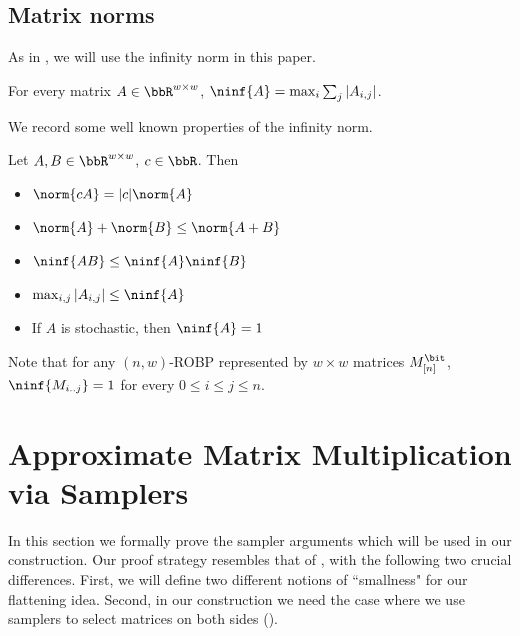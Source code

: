 \subsection{Matrix norms}
As in \cite{BCG18}, we will use the infinity norm in this paper.
\begin{definition}
For every matrix $A\in\bbR^{w\times w}$, $\ninf{A}=\max_i{\sum_j |A_{i,j}|}$.
\end{definition}
We record some well known properties of the infinity norm.
\begin{claim}
Let $A,B\in\bbR^{w\times w}$, $c\in \bbR$. Then
\begin{itemize}
\item
$\norm{cA}=|c|\norm{A}$
\item
$\norm{A}+\norm{B}\le\norm{A+B}$
\item
$\ninf{AB}\le \ninf{A}\ninf{B}$ 
\item
 $\max_{i,j} |A_{i,j}|\le\ninf{A}$
\item
If $A$ is stochastic, then $\ninf{A}=1$
\end{itemize}
\end{claim}
Note that for any $(n,w)$-ROBP represented by $w\times w$ matrices $M_{[n]}^{\bit}$, $\ninf{M_{i..j}}=1$ for every $0\le i\le j\le n$.


\section{Approximate Matrix Multiplication via Samplers}\label{sec:samp-our}




In this section we formally prove the sampler arguments which will be used in our construction. Our proof strategy resembles that of \cite{BCG18},  with the following two crucial differences. First, we will define two different notions of ``smallness" for our flattening idea. Second, in our construction we need the case where we use samplers to select matrices on both sides (). 

